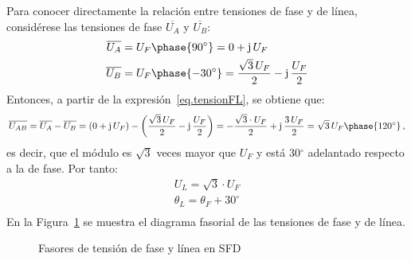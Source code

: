 \documentclass[11pt]{book} %
\begin{document}
	Para conocer directamente la relación entre tensiones de fase y de línea, considérese las tensiones de fase $\overline{U_A}$ y $\overline{U_B}$: 
	\begin{align*}
		\overline{U_A} &= U_F\phase{90^\circ}=0+\mathrm{j}\,U_F
		\\
		\overline{U_B} &= U_F\phase{-30^\circ}=\dfrac{\sqrt{3}\,U_F}{2}-\mathrm{j}\,\dfrac{U_F}{2}
	\end{align*}
	Entonces, a partir de la expresión~\eqref{eq.tensionFL}, se obtiene que:
	\begin{equation*}
		\overline{U_{AB}}=\overline{U_{A}}-\overline{U_{B}}=(0+\mathrm{j}\,U_F)-\left(\dfrac{\sqrt{3}\,U_F}{2}-\mathrm{j}\,\dfrac{U_F}{2}\right)=-\dfrac{\sqrt{3}\cdot U_F}{2}+\mathrm{j}\,\dfrac{3\,U_F}{2}=\sqrt{3}\,U_F \phase{ 120^\circ}\,,
	\end{equation*}
	es decir, que el módulo es $\sqrt{3}$ veces mayor que $U_F$ y está 30$^\circ$ adelantado respecto a la de fase. Por tanto:  
	\begin{equation}\label{eq.sfd_fase-linea}
		\boxed{
			\begin{array}{l}
				U_L = \sqrt{3}\cdot U_F\\
				\theta_L = \theta_F + 30^\circ\\
			\end{array}
		} 
	\end{equation}
	En la Figura~\ref{fig.linea-fase-SFD} se muestra el diagrama fasorial de las tensiones de fase y de línea. 
	\begin{figure}[htbp]
		\centering
		\hfil
		\caption{Fasores de tensión de fase y línea en SFD}
		\label{fig.linea-fase-SFD}
	\end{figure}
	
\end{document}
